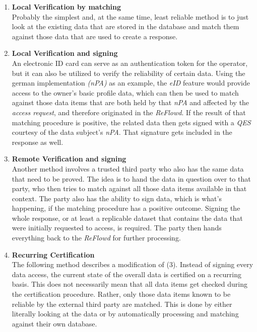 \documentclass[12pt,english,a4paper,titlepage,cleardoublepage=empty,dottedtoc]{report}
\begin{document}
\begin{enumerate}
\def\labelenumi{(\arabic{enumi})}
\item
  \textbf{Local Verification by matching}\\
  Probably the simplest and, at the same time, least reliable method is
  to just look at the existing data that are stored in the database and
  match them against those data that are used to create a response.
\item
  \textbf{Local Verification and signing}\\
  An electronic ID card can serve as an authentication token for the
  operator, but it can also be utilized to verify the reliability of
  certain data. Using the german implementation \emph{(nPA)} as an
  example, the \emph{eID} feature would provide access to the owner's
  basic profile data, which can then be used to match against those data
  items that are both held by that \emph{nPA} and affected by the
  \emph{access request}, and therefore originated in the \emph{ReFlowd}.
  If the result of that matching procedure is positive, the related data
  then gets signed with a \emph{QES} courtesy of the data subject's
  \emph{nPA}. That signature gets included in the response as well.
\item
  \textbf{Remote Verification and signing}\\
  Another method involves a trusted third party who also has the same
  data that need to be proved. The idea is to hand the data in question
  over to that party, who then tries to match against all those data
  items available in that context. The party also has the ability to
  sign data, which is what's happening, if the matching procedure has a
  positive outcome. Signing the whole response, or at least a replicable
  dataset that contains the data that were initially requested to
  access, is required. The party then hands everything back to the
  \emph{ReFlowd} for further processing.
\item
  \textbf{Recurring Certification}\\
  The following method describes a modification of (3). Instead of
  signing every data access, the current state of the overall data is
  certified on a recurring basis. This does not necessarily mean that
  all data items get checked during the certification procedure. Rather,
  only those data items known to be reliable by the external third party
  are matched. This is done by either literally looking at the data or
  by automatically processing and matching against their own database.

\end{enumerate}
\end{document}
